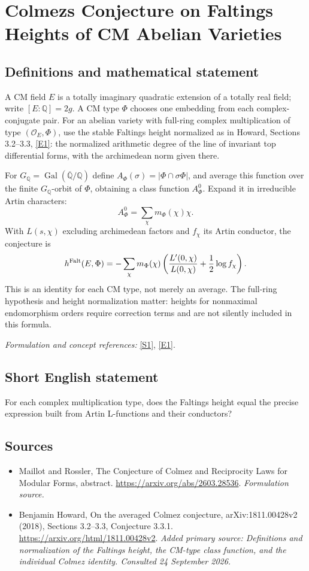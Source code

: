 \documentclass[11pt]{article}
\begin{document}
\section*{\texorpdfstring{Colmezs Conjecture on Faltings Heights of CM Abelian Varieties}{Colmezs Conjecture on Faltings Heights of CM Abelian Varieties}}\label{427}
\subsection{Definitions and mathematical statement}
A CM field $E$ is a totally imaginary quadratic extension of a totally real field; write $[E:{\mathbb{Q}}]=2g$. A CM type $\Phi$ chooses one embedding from each complex-conjugate pair. For an abelian variety with full-ring complex multiplication of type $(\mathcal O_E,\Phi)$, use the stable Faltings height normalized as in Howard, Sections 3.2--3.3, \href{https://arxiv.org/html/1811.00428v2}{[E1]}: the normalized arithmetic degree of the line of invariant top differential forms, with the archimedean norm given there.

For $G_{{\mathbb{Q}}}=\operatorname{Gal}(\overline{{\mathbb{Q}}}/{\mathbb{Q}})$ define $A_\Phi(\sigma)=|\Phi\cap\sigma\Phi|$, and average this function over the finite $G_{{\mathbb{Q}}}$-orbit of $\Phi$, obtaining a class function $A_\Phi^0$. Expand it in irreducible Artin characters:
\[
 A_\Phi^0=\sum_\chi m_\Phi(\chi)\chi.
\]
With $L(s,\chi)$ excluding archimedean factors and $f_\chi$ its Artin conductor, the conjecture is
\[
 h^{\rm Falt}(E,\Phi)=
 -\sum_\chi m_\Phi(\chi)
 \left(\frac{L'(0,\chi)}{L(0,\chi)}+\frac12\log f_\chi\right).
\]
This is an identity for each CM type, not merely an average. The full-ring hypothesis and height normalization matter: heights for nonmaximal endomorphism orders require correction terms and are not silently included in this formula.
\par\smallskip\textit{Formulation and concept references:} \href{https://arxiv.org/abs/2603.28536}{[S1]}, \href{https://arxiv.org/html/1811.00428v2}{[E1]}.

\subsection{Short English statement}
For each complex multiplication type, does the Faltings height equal the precise expression built from Artin L-functions and their conductors?
\subsection{Sources}
\begin{itemize}
\item[S1]Maillot and Rossler, The Conjecture of Colmez and Reciprocity Laws for Modular Forms, abstract.
\url{https://arxiv.org/abs/2603.28536}.
\textit{Formulation source.}
\item[E1]Benjamin Howard, On the averaged Colmez conjecture, arXiv:1811.00428v2 (2018), Sections 3.2–3.3, Conjecture 3.3.1.
\url{https://arxiv.org/html/1811.00428v2}.
\textit{Added primary source: Definitions and normalization of the Faltings height, the CM-type class function, and the individual Colmez identity. Consulted 24 September 2026.}
\end{itemize}
\end{document}

